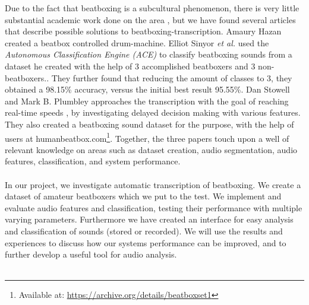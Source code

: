 Due to the fact that beatboxing is a subcultural phenomenon, there is very little substantial academic work done on the area \citep{Stowell2008}, but we have found several articles that describe possible solutions to beatboxing-transcription. Amaury Hazan created a beatbox controlled drum-machine\citep{Hazan2005}. Elliot Sinyor \textit{et al.} used the \textit{Autonomous Classification Engine (ACE)} to classify beatboxing sounds from a dataset he created with the help of 3 accomplished beatboxers and 3 non-beatboxers.\citep{Sinyor05}. They further found that reducing the amount of classes to 3, they obtained a 98.15\% accuracy, versus the initial best result 95.55\%. Dan Stowell and Mark B. Plumbley approaches the transcription with the goal of reaching real-time speeds \citep{Stowell2008}, by investigating delayed decision making with various features. They also created a beatboxing sound dataset for the purpose, with the help of users at humanbeatbox.com\footnote{Available at: \url{https://archive.org/details/beatboxset1}}. Together, the three papers touch upon a well of relevant knowledge on areas such as dataset creation, audio segmentation, audio features,  classification, and system performance.\\\\


In our project, we investigate automatic transcription of beatboxing. We create a dataset of amateur beatboxers which we put to the test. We implement and evaluate audio features and classification, testing their performance with multiple varying parameters.
Furthermore we have created an interface for easy analysis and classification of sounds (stored or recorded). We will use the results and experiences to discuss how our systems performance can be improved, and to further develop a useful tool for audio analysis.\\\\


